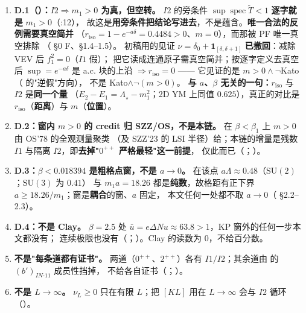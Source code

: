 \begin{notbox}
\begin{enumerate}[label=(\roman*)]
\item \textbf{D.1（）：$I2\Rightarrow m_1>0$ 为\textbf{真，但空转}。} $I2$ 的旁条件
      $\sup\operatorname{spec}\widetilde T<1$ \textbf{逐字就是} $m_1>0$（:12），
      故这是\textbf{用旁条件把结论写进去}，不是蕴含。\textbf{唯一合法的反例需要真空简并}
      （$r_{\mathrm{iso}}=1-e^{-a\delta}=0.4484>0$、$m=0$），而那被 PF 唯一真空排除
      （ \S0 F、\S1.4--1.5）。
      初稿用的见证 $\nu=\delta_0+\mathbf 1_{[\delta,\delta+1]}$ \textbf{已撤回}：减除 VEV 后 $f_1^2=0$（$I1$ 假）；
      把它读成连通原子需真空简并；按逐字定义去真空后 $\sup=e^{-a\delta}$ 是 a.c. 块的上沿
      $\Rightarrow r_{\mathrm{iso}}=0$ —— 它见证的是 $m>0\wedge\neg$Kato（ 的"逆假"方向），
      不是 Kato$\wedge\neg(m>0)$。
      \textbf{与 $a$、$\beta$ 无关的一句：}$r_{\mathrm{iso}}$ 与 $I2$ 是\textbf{同一个量}
      （$E_2-E_1=\Lambda_\star-m_1^2$；2D YM 上同值 $0.625$），真正的对比是
      $r_{\mathrm{iso}}$（\textbf{距离}）与 $m$（\textbf{位置}）。
\item \textbf{D.2：窗内 $m>0$ 的 credit 归 SZZ/OS，不是本链。} 在 $\beta<\beta_1$ 上 $m>0$ 由 OS'78 的全观测量聚类
      （及 SZZ'23 的 LSI 半径）给；本链的增量是残数 $I1$ 与隔离 $I2$，即\textbf{去掉"$0^{++}$ 严格最轻"这一前提}，
      仅此而已（；）。
\item \textbf{D.3：$\beta<0.018394$ 是粗格点窗，不是 $a\to0$。} 在该点 $a\Lambda\approx0.48$（$\mathrm{SU}(2)$；$\mathrm{SU}(3)$ 为 $0.41$）
      与 $m_1a=18.26$ 都是\textbf{纯数}，故格距有正下界 $a\ge18.26/m_1$；窗是\textbf{耦合}的窗、$a$ 固定，
      本文任何一处都不取 $a\to0$（ \S2.2--2.3）。
\item \textbf{D.4：不是 Clay。} $\beta=2.5$ 处 $\bar u=e\Delta N u\approx63.8>1$，KP 窗外的任何一步本文都没有；
      连续极限也没有（；）。Clay 的读数为 0，不给百分数。
\item \textbf{不是"每条道都有证书"。} 两道（$0^{++}$、$2^{++}$）各有 $I1/I2$；其余道由 \LT{} 的 $(b')_{IN\text{-}11}$ 成员性挡掉，
      不给各自证书（；）。
\item \textbf{不是 $L\to\infty$。} $\nu_L\ge0$ 只在有限 $L$；把 $[KL]$ 用在 $L\to\infty$ 会与 $I2$ 循环（）。
\end{enumerate}
\end{notbox}

